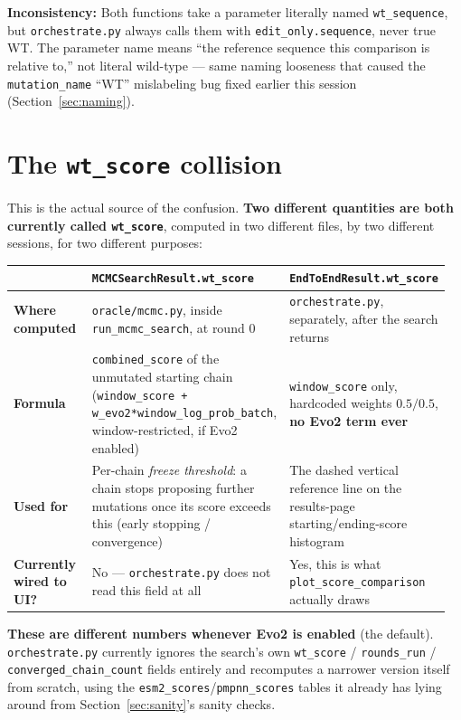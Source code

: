 \documentclass[11pt]{article}
\newcommand{\warnbox}[1]{%
  \par\noindent\colorbox{warnbg}{\parbox{\dimexpr\linewidth-2\fboxsep}{\textbf{Inconsistency:} #1}}\par\vspace{4pt}
}
\begin{document}
\warnbox{Both functions take a parameter literally named \texttt{wt\_sequence},
but \texttt{orchestrate.py} always calls them with
\texttt{edit\_only.sequence}, never true WT. The parameter name means ``the
reference sequence this comparison is relative to,'' not literal wild-type
--- same naming looseness that caused the \texttt{mutation\_name} ``WT''
mislabeling bug fixed earlier this session (Section~\ref{sec:naming}).}

\section{\texorpdfstring{The \texttt{wt\_score} collision}{The wt\_score collision}}
\label{sec:collision}

This is the actual source of the confusion. \textbf{Two different
quantities are both currently called \texttt{wt\_score}}, computed in two
different files, by two different sessions, for two different purposes:

\begin{center}
\begin{tabular}{@{}p{0.24\linewidth}p{0.36\linewidth}p{0.36\linewidth}@{}}
\toprule
 & \texttt{MCMCSearchResult.wt\_score} & \texttt{EndToEndResult.wt\_score} \\
\midrule
\textbf{Where computed} & \texttt{oracle/mcmc.py}, inside \texttt{run\_mcmc\_search}, at round 0 & \texttt{orchestrate.py}, separately, after the search returns \\
\textbf{Formula} & \texttt{combined\_score} of the unmutated starting chain (\texttt{window\_score + w\_evo2*window\_log\_prob\_batch}, window-restricted, if Evo2 enabled) & \texttt{window\_score} only, hardcoded weights $0.5/0.5$, \textbf{no Evo2 term ever} \\
\textbf{Used for} & Per-chain \emph{freeze threshold}: a chain stops proposing further mutations once its score exceeds this (early stopping / convergence) & The dashed vertical reference line on the results-page starting/ending-score histogram \\
\textbf{Currently wired to UI?} & No --- \texttt{orchestrate.py} does not read this field at all & Yes, this is what \texttt{plot\_score\_comparison} actually draws \\
\bottomrule
\end{tabular}
\end{center}

\textbf{These are different numbers whenever Evo2 is enabled} (the default).
\texttt{orchestrate.py} currently ignores the search's own \texttt{wt\_score}
/ \texttt{rounds\_run} / \texttt{converged\_chain\_count} fields entirely and
recomputes a narrower version itself from scratch, using the
\texttt{esm2\_scores}/\texttt{pmpnn\_scores} tables it already has lying
around from Section~\ref{sec:sanity}'s sanity checks.
\end{document}
